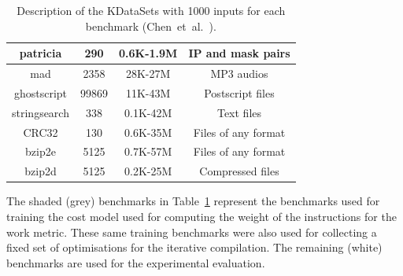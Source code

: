 \documentclass[sigplan,10pt]{acmart}
\newcommand{\etal}{et~al.}
\newcommand{\itercomp}{{iterative compilation}}
\begin{document}
\begin{table}[h]
{\begin{tabular}{|c|c|c|c|}
\rowcolor{gray!20}
patricia      & 290    & 0.6K-1.9M                  & IP and mask pairs              \\ \hline
\rowcolor{gray!20}
mad           & 2358   & 28K-27M                    & MP3 audios                     \\ \hline
\rowcolor{gray!20}
ghostscript   & 99869  & 11K-43M                    & Postscript files               \\ \hline
\rowcolor{gray!20}
stringsearch  & 338    &  0.1K-42M                 &  Text files                     \\ \hline
\rowcolor{gray!20}
CRC32         & 130    & 0.6K-35M                   & Files of any format            \\ \hline
\rowcolor{gray!20}
bzip2e        & 5125   & 0.7K-57M                   & Files of any format            \\ \hline
\rowcolor{gray!20}
bzip2d        & 5125   & 0.2K-25M                   & Compressed files               \\ \hline
\end{tabular}
}
\caption{Description of the KDataSets with 1000 inputs for each benchmark (Chen~\etal~\cite{chen10,chen12a}).}
\label{tab:kdatasets}
\end{table}

The shaded (grey) benchmarks in Table~\ref{tab:kdatasets} represent the benchmarks used for training the cost model used for computing the weight of the instructions for the work metric.
These same training benchmarks were also used for collecting a fixed set of optimisations for the {\itercomp}.
The remaining (white) benchmarks are used for the experimental evaluation.
\end{document}
